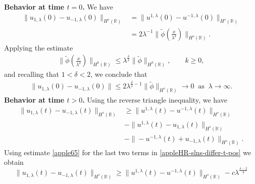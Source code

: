 \documentclass[12pt,reqno]{amsart}
\newcommand{\rr}{\mathbb{R}}
\theoremstyle{plain}  %
\theoremstyle{definition}
\begin{document}
\vskip0.1in
%
{\bf Behavior at time $t=0$.}  We have
%
%
\begin{equation}
	\begin{split}
		\|u_{1,\lambda}(0) - u_{-1,\lambda}(0) \|_{H^s(\rr)} 
		& = \|u^{1,\lambda}(0) - u^{-1,\lambda}(0) \|_{H^s(\rr)}
		\\
		& = 2 \lambda^{-1} \| \tilde{\phi}\left( \frac{x}{\lambda^\delta}
		\right) \|_{H^s(\rr)}.
		\label{apple}
	\end{split}
\end{equation}
Applying the estimate
\begin{equation}
	\begin{split}
		\|\tilde{\phi}\left( \frac{x}{\lambda^\delta}
		\right)\|_{H^{k}(\rr)} \le
		\lambda^{\frac{\delta}{2}}\|\tilde{\phi}\|_{H^{k}(\rr)},
		\qquad k\ge 0,
	\end{split}
\end{equation}
and recalling that $1<\delta<2$, we conclude that
\begin{equation}
	\begin{split}
		\|u_{1,\lambda}(0) - u_{-1,\lambda}(0) \| \le 2
		\lambda^{\frac{\delta}{2}-1} \|\tilde{\phi} \|_{H^s(\rr)} \to 0
		\; \; \text{as} \; \; \lambda \to \infty.
		\label{apple70}
	\end{split}
\end{equation}
%
%
%  
%
\vskip0.1in
{\bf Behavior at time  $t>0$.}  Using the reverse triangle inequality, we have
%
%
%
\begin{equation} 
	\label{appleHR-slns-differ-t-pos}
	\begin{split}
		\|
		u_{1,\lambda}(t)
		-
		u_{- 1,\lambda}(t)
		\|_{H^s(\rr)}
		&
		\ge
		\|
		u^{1,\lambda}(t)
		-
		u^{- 1,\lambda}(t)
		\|_{H^s(\rr)}
		\\
		&
		-
		\|
		u^{1,\lambda}(t)
		-
		u_{1,\lambda}(t)
		\|_{H^s(\rr)}
		\\
		&
		-
		\|
		-u^{-1,\lambda}(t)
		+
		u_{-1,\lambda}(t)
		\|_{H^s(\rr)} .
	\end{split}
\end{equation}
%
%
Using estimate \eqref{apple65} for the last two terms 
in \eqref{appleHR-slns-differ-t-pos} we obtain
%
%
%
\begin{equation} 
	\label{appleHR-slns-differ-t-pos-est}
	\|
	u_{1,\lambda}(t)
	-
	u_{- 1,\lambda}(t)
	\|_{H^s(\rr)}
	\ge
	\|
	u^{1,\lambda}(t)
	-
	u^{- 1,\lambda}(t)
	\|_{H^s(\rr)}
	-
	c \lambda^{\frac{\delta - 2}{4}}
\end{equation}
\end{document}

